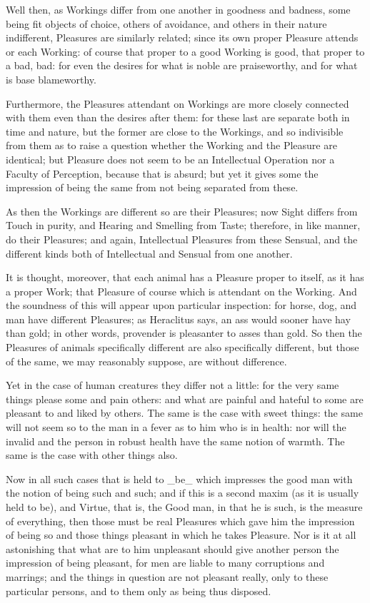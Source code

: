 Well then, as Workings differ from one another in goodness and badness,
some being fit objects of choice, others of avoidance, and others in
their nature indifferent, Pleasures are similarly related; since its own
proper Pleasure attends or each Working: of course that proper to a good
Working is good, that proper to a bad, bad: for even the desires for
what is noble are praiseworthy, and for what is base blameworthy.

Furthermore, the Pleasures attendant on Workings are more closely
connected with them even than the desires after them: for these last
are separate both in time and nature, but the former are close to the
Workings, and so indivisible from them as to raise a question whether
the Working and the Pleasure are identical; but Pleasure does not seem
to be an Intellectual Operation nor a Faculty of Perception, because
that is absurd; but yet it gives some the impression of being the same
from not being separated from these.

As then the Workings are different so are their Pleasures; now Sight
differs from Touch in purity, and Hearing and Smelling from Taste;
therefore, in like manner, do their Pleasures; and again, Intellectual
Pleasures from these Sensual, and the different kinds both of
Intellectual and Sensual from one another.

It is thought, moreover, that each animal has a Pleasure proper to
itself, as it has a proper Work; that Pleasure of course which is
attendant on the Working. And the soundness of this will appear upon
particular inspection: for horse, dog, and man have different Pleasures;
as Heraclitus says, an ass would sooner have hay than gold; in other
words, provender is pleasanter to asses than gold. So then the Pleasures
of animals specifically different are also specifically different, but
those of the same, we may reasonably suppose, are without difference.

Yet in the case of human creatures they differ not a little: for the
very same things please some and pain others: and what are painful and
hateful to some are pleasant to and liked by others. The same is the
case with sweet things: the same will not seem so to the man in a fever
as to him who is in health: nor will the invalid and the person in
robust health have the same notion of warmth. The same is the case with
other things also.

Now in all such cases that is held to _be_ which impresses the good man
with the notion of being such and such; and if this is a second maxim
(as it is usually held to be), and Virtue, that is, the Good man, in
that he is such, is the measure of everything, then those must be real
Pleasures which gave him the impression of being so and those things
pleasant in which he takes Pleasure. Nor is it at all astonishing that
what are to him unpleasant should give another person the impression of
being pleasant, for men are liable to many corruptions and marrings; and
the things in question are not pleasant really, only to these particular
persons, and to them only as being thus disposed.

